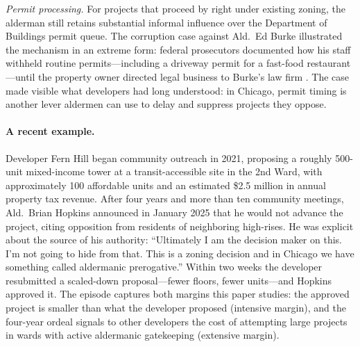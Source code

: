 \textit{Permit processing.}
For projects that proceed by right under existing
zoning, the alderman still retains substantial informal influence over the Department of
Buildings permit queue.
The corruption case against Ald.\ Ed Burke illustrated the
mechanism in an extreme form: federal prosecutors documented how his staff
withheld routine permits---including a driveway permit for a fast-food
restaurant---until the property owner directed legal business to Burke's law firm
\citep{spielman_aldermen_2019}.
The case made visible what developers had long
understood: in Chicago, permit timing is another lever aldermen can use to delay and suppress
projects they oppose.

\paragraph{A recent example.}
Developer Fern Hill began community
outreach in 2021, proposing a roughly 500-unit mixed-income tower at a
transit-accessible site in the 2nd Ward, with approximately 100 affordable units
and an estimated \$2.5 million in annual property tax revenue.
After four years and
more than ten community meetings, Ald.\ Brian Hopkins announced in January 2025
that he would not advance the project, citing opposition from residents of
neighboring high-rises.
He was explicit about the source of his authority:
``Ultimately I am the decision maker on this.
I'm not going to hide from that.
This is a zoning decision and in Chicago we have something called aldermanic
prerogative.''
\citep{achong_shortened_2025} Within two weeks the developer
resubmitted a scaled-down proposal---fewer floors, fewer units---and Hopkins
approved it.
The episode captures both margins this paper studies: the approved
project is smaller than what the developer proposed (intensive margin), and the
four-year ordeal signals to other developers the cost of attempting large projects
in wards with active aldermanic gatekeeping (extensive margin).


